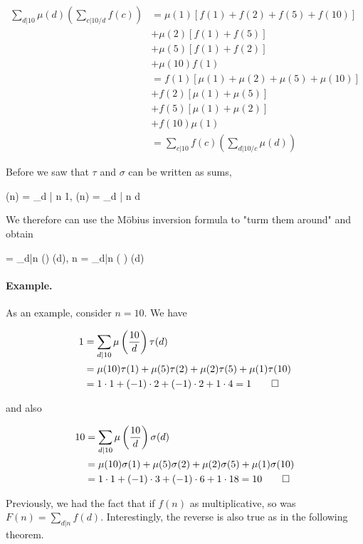 \begin{align*}
    \sum_{d | 10} \mu(d) \left( \sum_{c | 10/d} f(c) \right) &= \mu(1) [f(1) + f(2) + f(5) + f(10)] \\
    &+ \mu(2)[f(1) + f(5)] \\
    &+ \mu(5)[f(1) + f(2)] \\
    &+\mu(10) f(1) \\
    &= f(1) [\mu(1) + \mu(2) + \mu(5) + \mu(10)] \\
    &+ f(2) [\mu(1) + \mu(5)] \\
    &+ f(5) [\mu(1) + \mu(2)] \\
    &+ f(10) \mu(1) \\
    &= \sum_{c | 10} f(c) \left( \sum_{d | 10/c} \mu(d) \right)
\end{align*}

Before we saw that $\tau$ and $\sigma$ can be written as sums,

\bee
\tau(n) = \sum_{d | n} 1, \qquad \sigma(n) = \sum_{d | n} d
\eee

We therefore can use the Möbius inversion formula to "turm them around" and obtain

 = \sum_{d|n} \mu\left(\right) \tau(d), \qquad n = \sum_{d|n} \mu\left( \right) \sigma(d)
\eee

\paragraph{Example.} As an example, consider $n = 10$. We have

\begin{align*}
    1 &= \sum_{d|10} \mu\left(\frac{10}{d}\right) \tau(d) \\
    &= \mu(10) \tau(1) + \mu(5) \tau(2) + \mu(2) \tau(5) + \mu(1) \tau(10) \\
    &= 1 \cdot 1 + (-1) \cdot 2 + (-1) \cdot 2 + 1 \cdot 4 = 1 \qed
\end{align*}

and also

\begin{align*}
    10 &= \sum_{d|10} \mu\left(\frac{10}{d} \right) \sigma(d) \\
    &= \mu(10) \sigma(1) + \mu(5) \sigma(2) + \mu(2) \sigma(5) + \mu(1) \sigma(10) \\
    &= 1 \cdot 1 + (-1) \cdot 3 + (-1) \cdot 6 + 1 \cdot 18 = 10 \qed
\end{align*}

Previously, we had the fact that if $f(n)$ as multiplicative, so was $F(n) = \sum_{d|n} f(d)$. Interestingly, the reverse is also true as in the following theorem.

